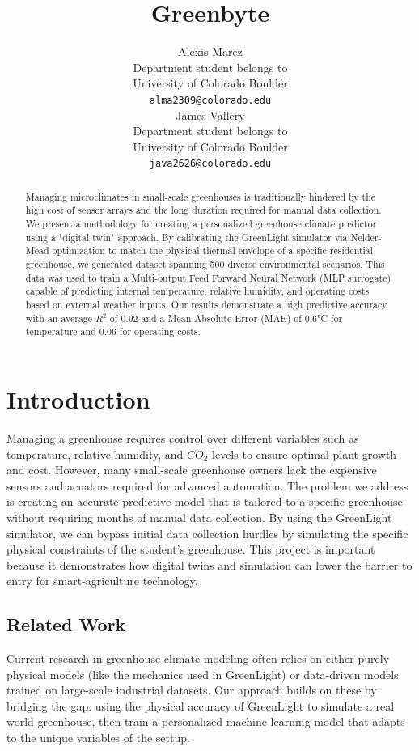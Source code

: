 \documentclass{article}
\title{Greenbyte}
\author{%
  Alexis Marez \\
  Department student belongs to\\
  University of Colorado Boulder\\
  \texttt{alma2309@colorado.edu} \\
  \And
  James Vallery\\
  Department student belongs to\\
  University of Colorado Boulder\\
  \texttt{java2626@colorado.edu} \\
}
\begin{document}
\maketitle


\begin{abstract}
  Managing microclimates in small-scale greenhouses is traditionally hindered by the high cost of sensor arrays and the long duration required for manual data collection. We present a methodology for creating a personalized greenhouse climate predictor using a "digital twin" approach. By calibrating the GreenLight simulator via Nelder-Mead optimization to match the physical thermal envelope of a specific residential greenhouse, we generated dataset spanning 500 diverse environmental scenarios. This data was used to train a Multi-output Feed Forward Neural Network (MLP surrogate) capable of predicting internal temperature, relative humidity, and operating costs based on external weather inputs. Our results demonstrate a high predictive accuracy with an average $R^2$ of 0.92 and a Mean Absolute Error (MAE) of 0.6°C for temperature and 0.06 for operating costs.
\end{abstract}


\section{Introduction}

Managing a greenhouse requires control over different variables such as temperature, relative humidity, and $CO_2$ levels to ensure optimal plant growth and cost. However, many small-scale greenhouse owners lack the expensive sensors and acuators required for advanced automation. The problem we address is creating an accurate predictive model that is tailored to a specific greenhouse without requiring months of manual data collection. By using the GreenLight simulator, we can bypass initial data collection hurdles by simulating the specific physical constraints of the student’s greenhouse. This project is important because it demonstrates how digital twins and simulation can lower the barrier to entry for smart-agriculture technology. 

\subsection{Related Work}
Current research in greenhouse climate modeling often relies on either purely physical models (like the mechanics used in GreenLight) or data-driven models trained on large-scale industrial datasets. Our approach builds on these by bridging the gap: using the physical accuracy of GreenLight to simulate a real world greenhouse, then train a personalized machine learning model that adapts to the unique variables of the settup.
\end{document}
